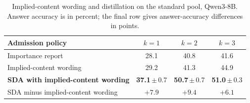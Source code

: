 \begin{table}[t]
\centering
\caption{Implied-content wording and distillation on the standard pool, Qwen3-8B. Answer accuracy is in percent; the
final row gives answer-accuracy differences in points.}
\label{tab:wordingdistill}
\small
\setlength{\tabcolsep}{4pt}
\begin{tabular}{lccc}
\toprule
Admission policy & $k=1$ & $k=2$ & $k=3$ \\
\midrule
Importance report & 28.1 & 40.8 & 41.6 \\
Implied-content wording & 29.2 & 41.3 & 44.9 \\
\textbf{SDA with implied-content wording} & \textbf{37.1}\,$\pm$\,0.7 & \textbf{50.7}\,$\pm$\,0.7 & \textbf{51.0}\,$\pm$\,0.3 \\
SDA minus implied-content wording & $+7.9$ & $+9.4$ & $+6.1$ \\
\bottomrule
\end{tabular}

\end{table}
